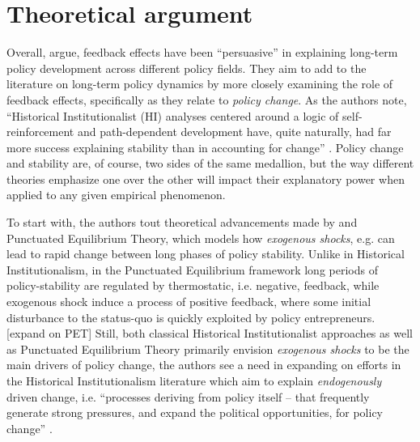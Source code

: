 \documentclass[11pt]{article}
\begin{document}
\section*{Theoretical argument}
Overall, \textcite[][]{Jacobs2014} argue, feedback effects have been \enquote{persuasive}  in explaining long-term policy development across different policy fields. They aim to add to the literature on long-term policy dynamics by more closely examining the role of feedback effects, specifically as they relate to \textit{policy change}. As the authors note, \enquote{Historical Institutionalist (HI) analyses centered around a logic of self-reinforcement and path-dependent development have, quite naturally, had far more success explaining stability than in accounting for change} \parencite[][p. 443]{Jacobs2014}. Policy change and stability are, of course, two sides of the same medallion, but the way different theories emphasize one over the other will impact their explanatory power when applied to any given empirical phenomenon.

To start with, the authors tout theoretical advancements made by \textcite[][]{Baumgartner2002} and Punctuated Equilibrium Theory, which models how \textit{exogenous shocks}, e.g. can lead to rapid change between long phases of policy stability. Unlike in Historical Institutionalism, in the Punctuated Equilibrium framework long periods of policy-stability are regulated by thermostatic, i.e. negative, feedback, while exogenous shock induce a process of positive feedback, where some initial disturbance to the status-quo is quickly exploited by policy entrepreneurs. {\color{red}[expand on PET]} Still, both classical Historical Institutionalist approaches as well as Punctuated Equilibrium Theory primarily envision \textit{exogenous shocks} to be the main drivers of policy change, the authors see a need in expanding on efforts in the Historical Institutionalism literature which aim to explain \textit{endogenously} driven change, i.e. \enquote{processes deriving from policy itself -- that frequently generate strong pressures, and expand the political opportunities, for policy change} \parencite[p. 442]{Jacobs2014}. 
\end{document}
